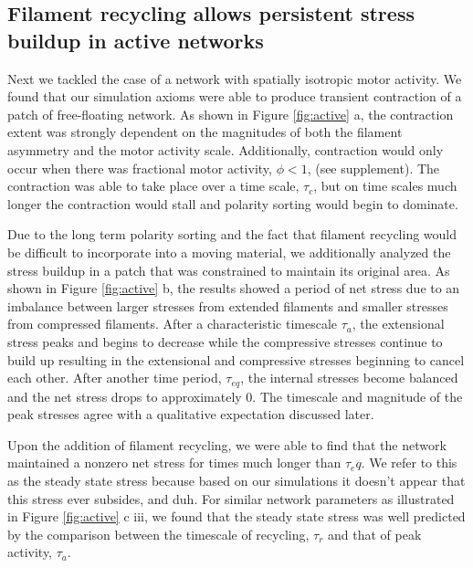 \documentclass[10pt,letterpaper]{article}
\begin{document}
\subsection*{Filament recycling allows persistent stress buildup in active networks}

Next we tackled the case of a network with spatially isotropic motor activity.  We found that our simulation axioms were able to produce transient contraction of a patch of free-floating network.  As shown in Figure \ref{fig:active} a, the contraction extent was strongly dependent on the magnitudes of both the filament asymmetry and the motor activity scale.  Additionally, contraction would only occur when there was fractional motor activity, $\phi<1$, (see supplement).  The contraction was able to take place over a time scale, $\tau_c$, but on time scales much longer the contraction would stall and polarity sorting would begin to dominate.

Due to the long term polarity sorting and the fact that filament recycling would be difficult to incorporate into a moving material, we additionally analyzed the stress buildup in a patch that was constrained to maintain its original area.  As shown in Figure \ref{fig:active} b, the results showed a period of net stress due to an imbalance between larger stresses from extended filaments and smaller stresses from compressed filaments.  After a characteristic timescale $\tau_a$, the extensional stress peaks and begins to decrease while the compressive stresses continue to build up resulting in the extensional and compressive stresses beginning to cancel each other.  After another time period, $\tau_{eq}$, the internal stresses become balanced and the net stress drops to approximately 0. The timescale and magnitude of the peak stresses agree with a qualitative expectation discussed later.

Upon the addition of filament recycling, we were able to find that the network maintained a nonzero net stress for times much longer than $\tau_eq$.  We refer to this as the steady state stress because based on our simulations it doesn't appear that this stress ever subsides, and duh.  For similar network parameters as illustrated in Figure \ref{fig:active} c iii, we found that the steady state stress was well predicted by the comparison between the timescale of recycling, $\tau_r$ and that of peak activity, $\tau_a$. 
\end{document}
